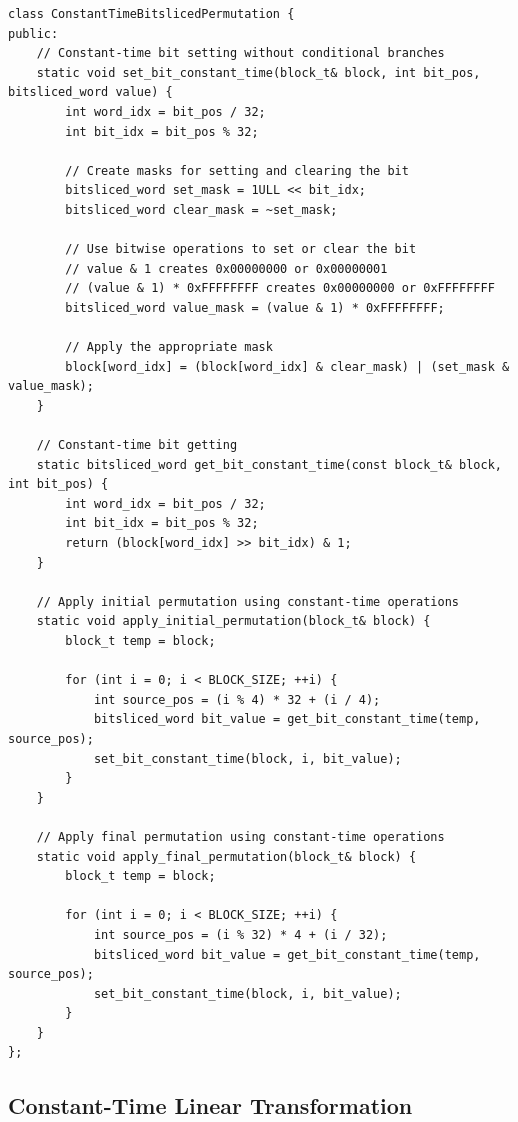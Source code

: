 \documentclass[12pt,a4paper]{article}
\begin{document}
\begin{lstlisting}[caption=Constant-Time Bit Manipulation]
class ConstantTimeBitslicedPermutation {
public:
    // Constant-time bit setting without conditional branches
    static void set_bit_constant_time(block_t& block, int bit_pos, bitsliced_word value) {
        int word_idx = bit_pos / 32;
        int bit_idx = bit_pos % 32;
        
        // Create masks for setting and clearing the bit
        bitsliced_word set_mask = 1ULL << bit_idx;
        bitsliced_word clear_mask = ~set_mask;
        
        // Use bitwise operations to set or clear the bit
        // value & 1 creates 0x00000000 or 0x00000001
        // (value & 1) * 0xFFFFFFFF creates 0x00000000 or 0xFFFFFFFF
        bitsliced_word value_mask = (value & 1) * 0xFFFFFFFF;
        
        // Apply the appropriate mask
        block[word_idx] = (block[word_idx] & clear_mask) | (set_mask & value_mask);
    }
    
    // Constant-time bit getting
    static bitsliced_word get_bit_constant_time(const block_t& block, int bit_pos) {
        int word_idx = bit_pos / 32;
        int bit_idx = bit_pos % 32;
        return (block[word_idx] >> bit_idx) & 1;
    }
    
    // Apply initial permutation using constant-time operations
    static void apply_initial_permutation(block_t& block) {
        block_t temp = block;
        
        for (int i = 0; i < BLOCK_SIZE; ++i) {
            int source_pos = (i % 4) * 32 + (i / 4);
            bitsliced_word bit_value = get_bit_constant_time(temp, source_pos);
            set_bit_constant_time(block, i, bit_value);
        }
    }
    
    // Apply final permutation using constant-time operations
    static void apply_final_permutation(block_t& block) {
        block_t temp = block;
        
        for (int i = 0; i < BLOCK_SIZE; ++i) {
            int source_pos = (i % 32) * 4 + (i / 32);
            bitsliced_word bit_value = get_bit_constant_time(temp, source_pos);
            set_bit_constant_time(block, i, bit_value);
        }
    }
};
\end{lstlisting}

\subsection{Constant-Time Linear Transformation}
\end{document}
